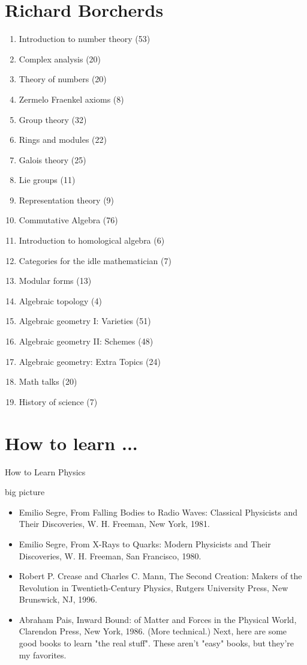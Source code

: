\documentclass[10pt,a4paper]{book}
\theoremstyle{definition}
\begin{document}
\chapter{Richard Borcherds}
\begin{enumerate}
\item Introduction to number theory (53)
\item Complex analysis (20)
\item Theory of numbers (20)
\item Zermelo Fraenkel axioms (8)
\item Group theory (32)
\item Rings and modules (22)
\item Galois theory (25)
\item Lie groups (11)
\item Representation theory (9)
\item Commutative Algebra (76)
\item Introduction to homological algebra (6)
\item Categories for the idle mathematician (7)
\item Modular forms (13)
\item Algebraic topology (4)
\item Algebraic geometry I: Varieties (51)
\item Algebraic geometry II: Schemes (48)
\item Algebraic geometry: Extra Topics (24)
\item Math talks (20)
\item History of science (7)
\end{enumerate}

\chapter{How to learn ...}
How to Learn Physics

big picture
\begin{itemize}
\item Emilio Segre, From Falling Bodies to Radio Waves: Classical Physicists and Their Discoveries, W. H. Freeman, New York, 1981.

\item Emilio Segre, From X-Rays to Quarks: Modern Physicists and Their Discoveries, W. H. Freeman, San Francisco, 1980.

\item Robert P. Crease and Charles C. Mann, The Second Creation: Makers of the Revolution in Twentieth-Century Physics, Rutgers University Press, New Brunswick, NJ, 1996.

\item Abraham Pais, Inward Bound: of Matter and Forces in the Physical World, Clarendon Press, New York, 1986. (More technical.)
Next, here are some good books to learn "the real stuff". These aren't "easy" books, but they're my favorites.
\end{itemize}
\end{document}
